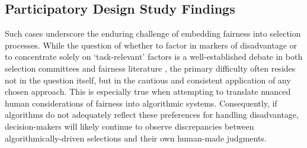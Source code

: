 \subsection{Participatory Design Study Findings}\label{ssec:cs_discussion}

Such cases underscore the enduring challenge of embedding fairness into selection processes. While the question of whether to factor in markers of disadvantage or to concentrate solely on `task-relevant' factors is a well-established debate in both selection committees and fairness literature \cite{dwork_fairness_2012}, the primary difficulty often resides not in the question itself, but in the cautious and consistent application of any chosen approach. This is especially true when attempting to translate nuanced human considerations of fairness into algorithmic systems. Consequently, if algorithms do not adequately reflect these preferences for handling disadvantage, decision-makers will likely continue to observe discrepancies between algorithmically-driven selections and their own human-made judgments.


